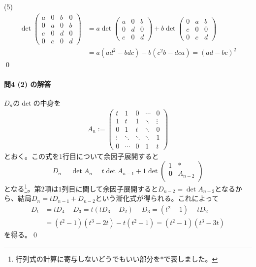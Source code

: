 (5) %
\begin{align*}
\det
\begin{pmatrix}
a & 0 & b & 0 \\
0 & a & 0 & b \\
c & 0 & d & 0 \\
0 & c & 0 & d
\end{pmatrix}
&= a \det
\begin{pmatrix}
a & 0 & b \\
0 & d & 0 \\
c & 0 & d
\end{pmatrix}
+ b \det
\begin{pmatrix}
0 & a & b \\
c & 0 & 0 \\
0 & c & d
\end{pmatrix}
 \\
&= a(ad^2 - bdc) - b(c^2 b - dca) = (ad - bc)^2
\end{align*}
\qed

\paragraph{問4 (2) の解答} $D_n$の$\det$の中身を
\begin{align*}
A_n := 
\begin{pmatrix}
t & 1 & 0 & \cdots & 0 \\
1 & t & 1 & \ddots & \vdots \\
0 & 1 & t & \ddots & 0 \\
\vdots & \ddots & \ddots & \ddots & 1 \\
0 & \cdots & 0 & 1 & t
\end{pmatrix}
\end{align*}
とおく。この式を$1$行目について余因子展開すると
\[
D_n = \det A_n
= t \det A_{n - 1} + 1 \det
\begin{pmatrix}
1 & * \\
\bm{0} & A_{n - 2} \\
\end{pmatrix}
\]
となる\footnote{行列式の計算に寄与しないどうでもいい部分を$*$で表しました。}。第$2$項は$1$列目に関して余因子展開すると$D_{n - 2} = \det A_{n - 2}$となるから、結局$D_n = t D_{n - 1} + D_{n - 2}$という漸化式が得られる。これによって
\begin{align*}
D_t &=
t D_4 - D_3 = t(t D_3 - D_2) - D_3 = (t^2 - 1) - t D_2 \\
&= (t^2 - 1)(t^3 - 2t) - t(t^2 - 1) = (t^2 - 1)(t^3 - 3t)
\end{align*}
を得る。\qed

